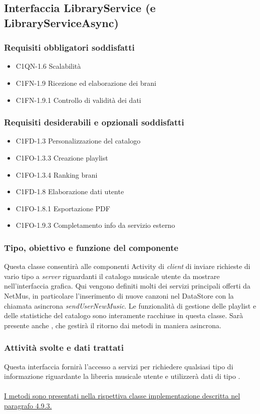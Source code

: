 \subsection{Interfaccia LibraryService (e LibraryServiceAsync)}
\subsubsection*{Requisiti obbligatori soddisfatti}
\begin{itemize}
    \item C1QN-1.6 Scalabilit\`a
    \item C1FN-1.9 Ricezione ed elaborazione dei brani
    \item C1FN-1.9.1 Controllo di validit\`a dei dati
\end{itemize}
\subsubsection*{Requisiti desiderabili e opzionali soddisfatti}
\begin{itemize}
    \item C1FD-1.3 Personalizzazione del catalogo
    \item C1FO-1.3.3 Creazione playlist
    \item C1FO-1.3.4 Ranking brani
    \item C1FD-1.8 Elaborazione dati utente
    \item C1FO-1.8.1 Esportazione PDF
    \item C1FO-1.9.3 Completamento info da servizio esterno
\end{itemize}
\subsubsection*{Tipo, obiettivo e funzione del componente}
Questa classe consentir\`a alle componenti Activity di \emph{client} di inviare
richieste di vario tipo a \emph{server} riguardanti il catalogo musicale utente
da mostrare nell'interfaccia grafica. Qui vengono definiti molti dei servizi
principali offerti da NetMus, in particolare l'inserimento di nuove canzoni nel
DataStore con la chiamata asincrona \emph{sendUserNewMusic}. Le
funzionalit\`a di gestione delle playlist e delle statistiche del
catalogo sono interamente racchiuse in questa classe. Sar\`a presente anche
, che gestir\`a il ritorno dai metodi in maniera asincrona. 
\subsubsection*{Attivit\`a svolte e dati trattati}
Questa interfaccia fornir\`a l'accesso a servizi per richiedere qualsiasi tipo
di informazione riguardante la libreria musicale utente e utilizzer\`a dati di
tipo .\\\\
\underline{I metodi sono presentati nella rispettiva classe implementazione
descritta nel paragrafo 4.9.3.}



